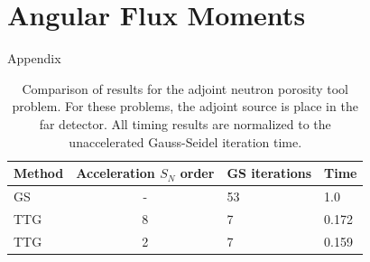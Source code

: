 \documentclass[preprint,12pt]{elsarticle}
\begin{document}
\newpage
\appendix

\section{Angular Flux Moments}
\label{sec:angular-flux-moments}

Appendix


\newpage

\singlespacing





\clearpage

\begin{table}[p]
  \caption{
    Comparison of results for the adjoint neutron porosity tool
    problem. For these problems, the adjoint source is place in the
    far detector.  All timing results are normalized to the
    unaccelerated Gauss-Seidel iteration time.
  }
  \label{tab:adjoint-porosity-tool}
  \begin{center}
    \begin{tabular}{lcll}\hline\hline
      Method & Acceleration $S_N$ order & GS iterations & Time \\\hline
      GS & - & 53 & 1.0   \\
      TTG & 8 & 7 & 0.172 \\
      TTG & 2 & 7 & 0.159 \\
      \hline\hline
    \end{tabular}
  \end{center}
\end{table}


\clearpage
\end{document}
